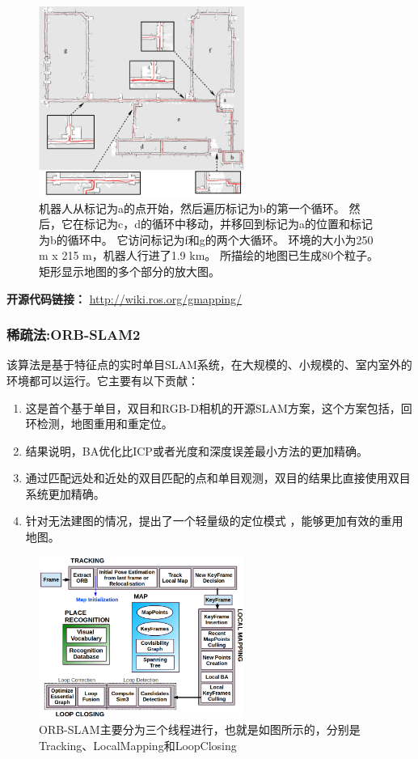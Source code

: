 \documentclass[cs4size,a4paper]{ctexart}
\numberwithin{equation}{section}
\numberwithin{table}{section}
\numberwithin{figure}{section}
\begin{document}
\begin{figure}[H]
  \centering
  \includegraphics[width=0.6\textwidth]{figure/gmapping-1.png}
  \caption{机器人从标记为a的点开始，然后遍历标记为b的第一个循环。 然后，它在标记为c，d的循环中移动，并移回到标记为a的位置和标记为b的循环中。 它访问标记为f和g的两个大循环。 环境的大小为250 m x 215 m，机器人行进了1.9 km。 所描绘的地图已生成80个粒子。 矩形显示地图的多个部分的放大图。}
\end{figure}

\textbf{开源代码链接：}
\url{http://wiki.ros.org/gmapping/}

\subsubsection{稀疏法:ORB-SLAM2}
该算法\cite{murORB2}是基于特征点的实时单目SLAM系统，在大规模的、小规模的、室内室外的环境都可以运行。它主要有以下贡献：
\begin{enumerate}[1)]
        \item 这是首个基于单目，双目和RGB-D相机的开源SLAM方案，这个方案包括，回环检测，地图重用和重定位。
        \item 结果说明，BA优化比ICP或者光度和深度误差最小方法的更加精确。
        \item 通过匹配远处和近处的双目匹配的点和单目观测，双目的结果比直接使用双目系统更加精确。
        \item 针对无法建图的情况，提出了一个轻量级的定位模式 ，能够更加有效的重用地图。
\end{enumerate}

\begin{figure}[H]
    \centering
    \includegraphics[width=0.6\textwidth]{figure/orb.png}
    \caption{ORB-SLAM主要分为三个线程进行，也就是如图所示的，分别是Tracking、LocalMapping和LoopClosing}
\end{figure}
\end{document}

